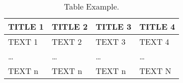 %

\begin{table}[H]
    \caption{Table Example.\label{C1T1:tableExample}}
        \begin{tabularx}{\textwidth}{CCCC}
            \toprule
            \textbf{TITLE 1} & \textbf{TITLE 2}   & \textbf{TITLE 3} & \textbf{TITLE 4}        \\
            \midrule
            TEXT 1   & TEXT 2 & TEXT 3 & TEXT 4 \\
            …        & …     & …    & …     \\  
            TEXT n   & TEXT n & TEXT n & TEXT N \\
            \bottomrule
        \end{tabularx}
\end{table}